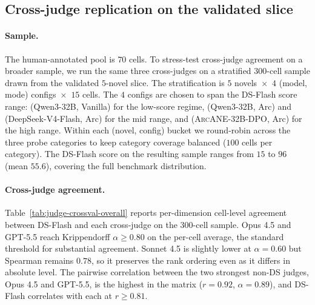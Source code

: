\documentclass{llmxive}
\providecommand{\ours}{\textsc{ArcANE}}
\begin{document}
\subsection{Cross-judge replication on the validated slice\label{app:judge-crossval-cross}}

\paragraph{Sample.} The human-annotated pool is $70$ cells. To stress-test cross-judge agreement on a broader sample, we run the same three cross-judges on a stratified $300$-cell sample drawn from the validated $5$-novel slice. The stratification is $5$ novels~$\times$~$4$ (model, mode) configs~$\times$~$15$ cells. The $4$ configs are chosen to span the DS-Flash score range: (Qwen3-32B, Vanilla) for the low-score regime, (Qwen3-32B, Arc) and (DeepSeek-V4-Flash, Arc) for the mid range, and (\ours{}-32B-DPO, Arc) for the high range. Within each (novel, config) bucket we round-robin across the three probe categories to keep category coverage balanced ($100$ cells per category). The DS-Flash score on the resulting sample ranges from $15$ to $96$ (mean $55.6$), covering the full benchmark distribution.

\paragraph{Cross-judge agreement.} Table~\ref{tab:judge-crossval-overall} reports per-dimension cell-level agreement between DS-Flash and each cross-judge on the $300$-cell sample. Opus 4.5 and GPT-5.5 reach Krippendorff $\alpha{\geq}0.80$ on the per-cell average, the standard threshold for substantial agreement. Sonnet 4.5 is slightly lower at $\alpha{=}0.60$ but Spearman remains $0.78$, so it preserves the rank ordering even as it differs in absolute level. The pairwise correlation between the two strongest non-DS judges, Opus 4.5 and GPT-5.5, is the highest in the matrix ($r{=}0.92$, $\alpha{=}0.89$), and DS-Flash correlates with each at $r{\geq}0.81$.
\end{document}
